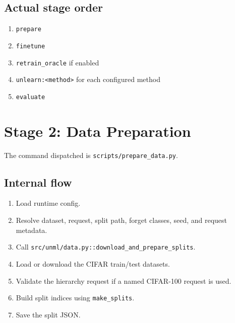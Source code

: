 \documentclass[10pt,a4paper]{article}
\begin{document}
\subsection{Actual stage order}
\begin{enumerate}
  \item \texttt{prepare}
  \item \texttt{finetune}
  \item \texttt{retrain\_oracle} if enabled
  \item \texttt{unlearn:<method>} for each configured method
  \item \texttt{evaluate}
\end{enumerate}

\section{Stage 2: Data Preparation}
The command dispatched is \texttt{scripts/prepare\_data.py}.

\subsection{Internal flow}
\begin{enumerate}
  \item Load runtime config.
  \item Resolve dataset, request, split path, forget classes, seed, and request metadata.
  \item Call \texttt{src/unml/data.py::download\_and\_prepare\_splits}.
  \item Load or download the CIFAR train/test datasets.
  \item Validate the hierarchy request if a named CIFAR-100 request is used.
  \item Build split indices using \texttt{make\_splits}.
  \item Save the split JSON.
\end{enumerate}
\end{document}
